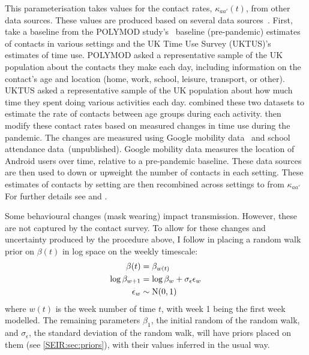 \documentclass[thesis.tex]{subfiles}
\begin{document}
This parameterisation takes values for the contact rates, $\kappa_{aa'}(t)$, from other data sources.
These values are produced based on several data sources~\autocites{vanleeuwenTime}{vanleeuwenAugmenting}.
First, take a baseline from the POLYMOD study's~\autocite{mossongSocial} baseline (pre-pandemic) estimates of contacts in various settings and the UK Time Use Survey (UKTUS)'s~\autocite{UKTUS} estimates of time use.
POLYMOD asked a representative sample of the UK population about the contacts they make each day, including information on the contact's age and location (home, work, school, leisure, transport, or other).
UKTUS asked a representative sample of the UK population about how much time they spent doing various activities each day.
\Textcite{vanleeuwenAugmenting} combined these two datasets to estimate the rate of contacts between age groups during each activity.
\Textcite{birrellRealtime} then modify these contact rates based on measured changes in time use during the pandemic.
The changes are measured using Google mobility data~\autocite{googleCOVID19} and school attendance data~(unpublished).
Google mobility data measures the location of Android users over time, relative to a pre-pandemic baseline.
These data sources are then used to down or upweight the number of contacts in each setting.
These estimates of contacts by setting are then recombined across settings to from $\kappa_{aa'}$
For further details see \textcite{vanleeuwenAugmenting} and \textcite[supplementary material]{birrellRealtime}.

Some behavioural changes (\eg mask wearing) impact transmission.
However, these are not captured by the contact survey.
To allow for these changes and uncertainty produced by the procedure above, I follow \textcite{birrellRealtime} in placing a random walk prior on $\beta(t)$ in log space on the weekly timescale:
\begin{align}
    \beta(t) &= \beta_{w(t)} \\
    \log\beta_{w+1} &= \log\beta_w + \sigma_\epsilon \epsilon_w \\
    \epsilon_w &\sim \operatorname{N}(0, 1)
\end{align}
where $w(t)$ is the week number of time $t$, with week 1 being the first week modelled.
The remaining parameters $\beta_1$, the initial random of the random walk, and $\sigma_\epsilon$, the standard deviation of the random walk, will have priors placed on them (see \cref{SEIR:sec:priors}), with their values inferred in the usual way.
\end{document}
